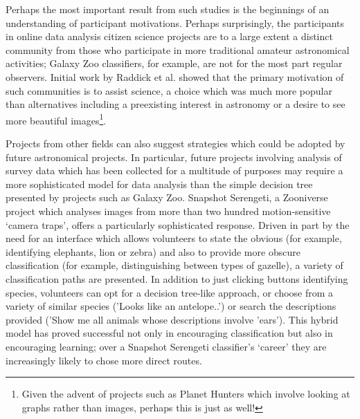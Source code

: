 \documentclass{ar2e}
\begin{document}

Perhaps the most important result from such studies is the beginnings of an
understanding of participant motivations. Perhaps surprisingly, the
participants in online data analysis citizen science projects are to a large
extent a distinct community from those who participate in more traditional
amateur astronomical activities; Galaxy Zoo classifiers, for example, are not
for the most part regular observers. Initial work by Raddick et al. showed
that the primary motivation of such communities is to assist science, a choice
which was much more popular than alternatives including a preexisting interest
in astronomy or a desire to see more beautiful images\footnote{Given the
advent of projects such as Planet Hunters which involve looking at graphs
rather than images, perhaps this is just as well!}. 

Projects from other fields can also suggest strategies which could be adopted
by future astronomical projects. In particular, future projects involving
analysis of survey data which has been collected for a multitude of purposes
may require a more sophisticated model for data analysis than the simple
decision tree presented by projects such as Galaxy Zoo. Snapshot Serengeti, a
Zooniverse project which analyses images from more than two hundred
motion-sensitive `camera traps', offers a particularly sophisticated response.
Driven in part by the need for an interface which allows volunteers to state
the obvious (for example, identifying elephants, lion or zebra) and also to
provide more obscure classification (for example, distinguishing between types
of gazelle), a variety of classification paths are presented. In addition to
just clicking buttons identifying species, volunteers can opt for a decision
tree-like approach, or choose from a variety of similar species ('Looks like
an antelope..') or search the descriptions provided ('Show me all animals
whose descriptions involve 'ears'). This hybrid model has proved successful
not only in encouraging classification but also in encouraging learning; over
a Snapshot Serengeti classifier's `career' they are increasingly likely to
chose more direct routes.
\end{document}
